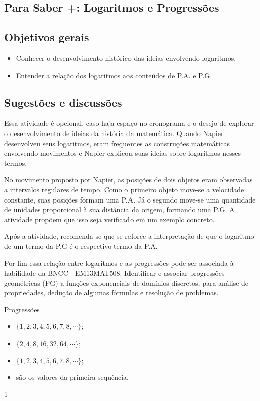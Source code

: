 \clearpage
\begin{texto}
{
	\section{Para Saber +: Logaritmos e Progressões}
	\subsection{Objetivos gerais}
	\begin{itemize}
	\item Conhecer o desenvolvimento histórico das ideias envolvendo logaritmos.
	\item Entender a relação dos logaritmos aos conteúdos de P.A. e P.G.
	\end{itemize}

	\subsection{Sugestões e discussões}
	Essa atividade é opcional, caso haja espaço no cronograma e o desejo de explorar o desenvolvimento de ideias da história da matemática. Quando Napier desenvolveu seus logaritmos, eram frequentes as construções matemáticas envolvendo movimentos e Napier explicou suas ideias sobre logaritmos nesses termos.

	No movimento proposto por Napier, as posições de dois objetos eram observadas a intervalos regulares de tempo. Como o primeiro objeto move-se a velocidade constante, suas posições formam uma P.A. Já o segundo move-se uma quantidade de unidades proporcional à sua distância da origem, formando uma P.G. A atividade propõem que isso seja verificado em um exemplo concreto.

	Após a atividade, recomenda-se que se reforce a interpretação de que o logaritmo de um termo da P.G é o respectivo termo da P.A.

	Por fim essa relação entre logaritmos e as progressões pode ser associada à habilidade da BNCC - EM13MAT508: Identificar e associar progressões geométricas (PG) a funções exponenciais de domínios discretos, para análise de propriedades, dedução de algumas fórmulas e resolução de problemas.
}
\end{texto}
\marginpar{\vspace{.5em}}
\begin{answer}{Progressões}
{
	\begin{itemize}
	\item $\{1,2,3,4,5,6,7,8,\cdots\};$
	\item[] $\{2,4,8,16,32,64,\cdots\};$
	\item $\{1,2,3,4,5,6,7,8,\cdots\};$
	\item são os valores da primeira sequência.
	\end{itemize}
}{1}
\end{answer}

